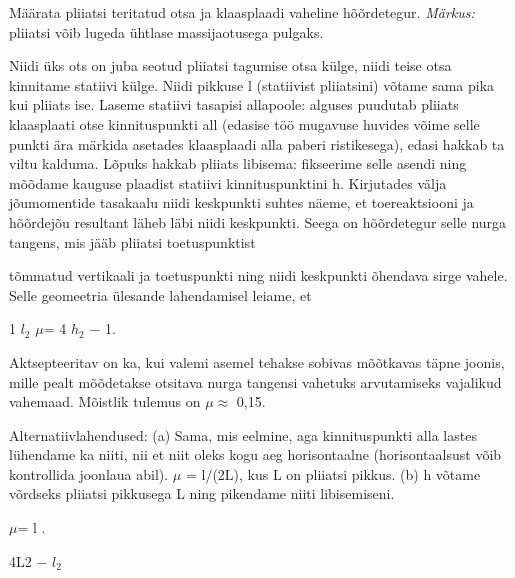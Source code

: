 
Määrata pliiatsi teritatud otsa ja klaasplaadi vaheline hõõrdetegur.
\textit{Märkus:} pliiatsi võib lugeda ühtlase massijaotusega pulgaks.

\hint

\solu
Niidi üks ots on juba seotud pliiatsi tagumise otsa külge, niidi teise otsa kinnitame statiivi külge. Niidi pikkuse l (statiivist pliiatsini) võtame sama pika kui pliiats ise. Laseme statiivi tasapisi allapoole: alguses puudutab pliiats klaasplaati otse kinnituspunkti all (edasise töö mugavuse huvides võime selle punkti ära märkida asetades klaasplaadi alla paberi ristikesega), edasi hakkab ta viltu kalduma. Lõpuks hakkab pliiats libisema: fikseerime selle asendi ning mõõdame kauguse plaadist statiivi kinnituspunktini h. Kirjutades välja jõumomentide tasakaalu niidi keskpunkti suhtes näeme, et toereaktsiooni ja hõõrdejõu resultant läheb läbi niidi keskpunkti. Seega on hõõrdetegur selle nurga tangens, mis jääb pliiatsi toetuspunktist

tõmmatud vertikaali ja toetuspunkti ning niidi keskpunkti õhendava sirge vahele. Selle geomeetria ülesande lahendamisel leiame, et

1 $l_2$ $\mu$= 4 $h_2$ $-$ 1.

Aktsepteeritav on ka, kui valemi asemel tehakse sobivas mõõtkavas täpne joonis, mille pealt mõõdetakse otsitava nurga tangensi vahetuks arvutamiseks vajalikud vahemaad. Mõistlik tulemus on $\mu \approx$ 0,15.

Alternatiivlahendused: (a) Sama, mis eelmine, aga kinnituspunkti alla lastes lühendame ka niiti, nii et niit oleks kogu aeg horisontaalne (horisontaalsust võib kontrollida joonlaua abil). $\mu$ = l/(2L), kus L on pliiatsi pikkus. (b) h võtame võrdseks pliiatsi pikkusega L ning pikendame niiti libisemiseni.

$\mu$= l .

4L2 $-$ $l_2$
\probend
